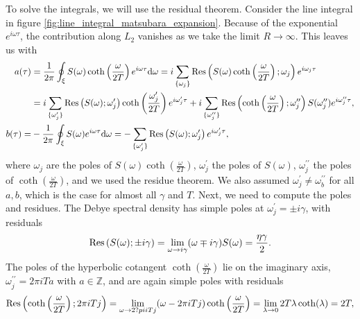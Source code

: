 To solve the integrals, we will use the residual theorem. Consider the line integral in figure \ref{fig:line_integral_matsubara_expansion}. 
Because of the exponential $e^{i\omega\tau}$, the contribution
along $L_2$ vanishes as we take the limit $R\rightarrow\infty$. This leaves us with
\begin{equation*}
    \begin{split}
        a(\tau) &= \frac{1}{2\pi}\oint_\xi S(\omega)\coth\left(
        \frac{\omega}{2T}
        \right)e^{i\omega\tau} \text{d}\omega = i\sum_{\{\omega_j\}}\Residue\left(
            S(\omega)\coth\left(
                \frac{\omega}{2T}
            \right); \omega_j
        \right)e^{i\omega_j\tau}\\
        &= i\sum_{\{\omega_j^\prime\}} \Residue\left(
            S(\omega); \omega_j^\prime
            \right) \coth\left(
                \frac{\omega_j^\prime}{2T}
            \right)e^{i\omega_j^\prime\tau} + 
            i\sum_{\{\omega_j^{\prime\prime}\}} \Residue\left(
            \coth\left(
                \frac{\omega}{2T}
            \right); \omega_j^{\prime\prime}
            \right) S(\omega_j^{\prime\prime}) e^{i\omega_j^{\prime\prime}\tau}, \\
        b(\tau) =& -\frac{1}{2\pi} \oint_\xi S(\omega) e^{i\omega\tau} \text{d}\omega =
    -\sum_{\{\omega_j^\prime\}} \Residue\left(
            S(\omega); \omega_j^\prime
            \right) e^{i\omega_j^\prime\tau},
    \end{split}
\end{equation*}
where $\omega_j$ are the poles of $S(\omega)\coth\left(\frac{\omega}{2T}\right)$,
$\omega_j^\prime$ the poles of $S(\omega)$, $\omega_j^{\prime\prime}$ the poles of
$\coth\left(\frac{\omega}{2T}\right)$, and we used the residue theorem. We also
assumed $\omega_j^\prime \neq \omega_b^{\prime\prime}$ for all $a, b$, which is the case for almost all $\gamma$ and $T$. Next, we need to compute
the poles and residues. The Debye spectral density has simple poles at $\omega_j^\prime=\pm i\gamma$,
with residuals
\begin{equation*}
    \Residue\left(S(\omega);\pm i\gamma\right) = \lim_{\omega\rightarrow i\gamma}(\omega\mp i\gamma)S(\omega) = \frac{\eta\gamma}{2}.
\end{equation*}
The poles of the hyperbolic cotangent $\coth\left(\frac{\omega}{2T}\right)$ lie on the imaginary axis, $\omega_j^{\prime\prime} = 2\pi iTa$ with $a\in\mathbb{Z}$,
and are again simple poles with residuals
\begin{equation*}
    \Residue\left(\coth\left(\frac{\omega}{2T}\right);2\pi iTj\right) =
    \lim_{\omega\rightarrow 2?pi iTj} (\omega-2\pi iTj) \coth\left(
        \frac{\omega}{2T}
    \right) = \lim_{\lambda\rightarrow 0} 2T\lambda\coth(\lambda) = 2T,
\end{equation*}

